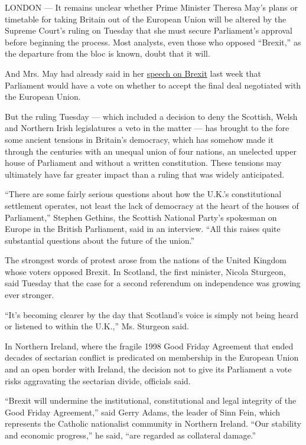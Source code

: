LONDON --- It remains unclear whether Prime Minister Theresa May's plans
or timetable for taking Britain out of the European Union will be
altered by the Supreme Court's ruling on Tuesday that she must secure
Parliament's approval before beginning the process. Most analysts, even
those who opposed ``Brexit,'' as the departure from the bloc is known,
doubt that it will.

And Mrs. May had already said in her
\href{https://www.nytimes.com/2017/01/17/world/europe/brexit-theresa-may-uk-eu.html?_r=0}{speech
on Brexit} last week that Parliament would have a vote on whether to
accept the final deal negotiated with the European Union.

But the ruling Tuesday --- which included a decision to deny the
Scottish, Welsh and Northern Irish legislatures a veto in the matter ---
has brought to the fore some ancient tensions in Britain's democracy,
which has somehow made it through the centuries with an unequal union of
four nations, an unelected upper house of Parliament and without a
written constitution. These tensions may ultimately have far greater
impact than a ruling that was widely anticipated.

``There are some fairly serious questions about how the U.K.'s
constitutional settlement operates, not least the lack of democracy at
the heart of the houses of Parliament,'' Stephen Gethins, the Scottish
National Party's spokesman on Europe in the British Parliament, said in
an interview. ``All this raises quite substantial questions about the
future of the union.''

The strongest words of protest arose from the nations of the United
Kingdom whose voters opposed Brexit. In Scotland, the first minister,
Nicola Sturgeon, said Tuesday that the case for a second referendum on
independence was growing ever stronger.

``It's becoming clearer by the day that Scotland's voice is simply not
being heard or listened to within the U.K.,'' Ms. Sturgeon said.

In Northern Ireland, where the fragile 1998 Good Friday Agreement that
ended decades of sectarian conflict is predicated on membership in the
European Union and an open border with Ireland, the decision not to give
its Parliament a vote risks aggravating the sectarian divide, officials
said.

``Brexit will undermine the institutional, constitutional and legal
integrity of the Good Friday Agreement,'' said Gerry Adams, the leader
of Sinn Fein, which represents the Catholic nationalist community in
Northern Ireland. ``Our stability and economic progress,'' he said,
``are regarded as collateral damage.''

